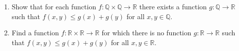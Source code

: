 \documentclass{article}
\begin{document}
\setlength{\parindent}{0pt}
\begin{enumerate}[label=(\alph*)]
\item Show that for each function $f:\mathbb{Q}\times\mathbb{Q}\to\mathbb{R}$ there exists a function $g:\mathbb{Q}\to\mathbb{R}$ such that $f(x,y)\le g(x)+g(y)$ for all $x,y\in\mathbb{Q}$.
\item Find a function $f:\mathbb{R}\times\mathbb{R}\to\mathbb{R}$ for which there is no function $g:\mathbb{R}\to\mathbb{R}$ such that $f(x,y)\le g(x)+g(y)$ for all $x,y\in\mathbb{R}$.
\end{enumerate}
\end{document}
